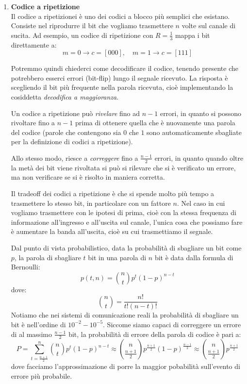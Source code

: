 \documentclass[a4paper,11pt]{article}
\begin{document}
\begin{enumerate}
\item \textbf{\textsf{Codice a ripetizione}} \\
Il codice a ripetizionei è uno dei codici a blocco più semplici che esistano. Consiste nel riprodurre il bit che vogliamo trasmettere $n$ volte sul canale di sucita. Ad esempio, un codice di ripetizione con $R = \frac{1}{3}$ mappa i bit direttamente a:
$$
m = 0 \rightarrow c = [000], \quad
m = 1 \rightarrow c = [111]
$$

Potremmo quindi chiederci come decodificare il codice, tenendo presente che potrebbero esserci errori (bit-flip) lungo il segnale ricevuto. La risposta è scegliendo il bit più frequente nella parola ricevuta, cioè implementando la cosiddetta \textit{decodifica a maggioranza}.

Un codice a ripetizione può \textit{rivelare} fino ad $n - 1$ errori, in quanto si possono rivoltare fino a $n - 1$ prima di ottenere quella che è nuovamente una parola del codice (parole che contengono sia $0$ che $1$ sono automaticamente sbagliate per la definizione di codici a ripetizione).

Allo stesso modo, riesce a \textit{correggere} fino a $\frac{n - 1}{2}$ errori, in quanto quando oltre la metà dei bit viene rivoltata si può si rilevare che si è verificato un errore, ma non verificare se si è risolto in maniera corretta.

Il tradeoff dei codici a ripetizione è che si spende molto più tempo a trasmettere lo stesso bit, in particolare con un fattore $n$. Nel caso in cui vogliamo trasmettere con le ipotesi di prima, cioè con la stessa frequenza di informazione all'ingresso e all'uscita sul canale, l'unica cosa che possiamo fare è aumentare la banda all'uscita, cioè su cui trasmettiamo il segnale. 

Dal punto di vista probabilistico, data la probabilità di sbagliare un bit come $p$, la parola di sbagliare $t$ bit in una parola di $n$ bit è data dalla formula di Bernoulli:
$$
p(t, n) = \binom{n}{t} p^t (1 - p)^{n - t}
$$
dove:
$$
\binom{n}{t} = \frac{n!}{t!(n - t)!}
$$
Notiamo che nei sistemi di comunicazione reali la probabilità di sbagliare un bit è nell'ordine di $10^{-2} - 10^{-5}$.
Siccome siamo capaci di correggere un errore di al massimo $\frac{n - 1}{2}$ bit, la probabilità di errore della parola di codice è pari a:
$$
P = \sum_{t = \frac{n + 1}{2}}^n \binom{n}{t} p^t (1 - p)^{n - t} \approx 
\binom{n}{\frac{n + 1}{2}} p^{\frac{n + 1}{2}} (1 - p)^{\frac{n - 1}{2}} \approx \binom{n}{\frac{n + 1}{2}} p^{\frac{n + 1}{2}}
$$
dove facciamo l'approssimazione di porre la maggior pobabilità sull'evento di errore più probabile.


\end{enumerate}
\end{document}
